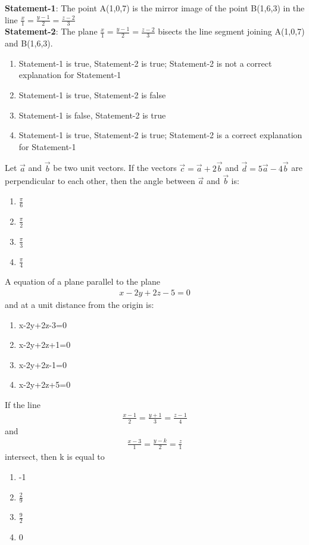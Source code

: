\item \textbf{Statement-1}: The point A(1,0,7) is the mirror image of the point B(1,6,3) in the line $\frac{x}{1}=\frac{y-1}{2}=\frac{z-2}{3}$\\
\textbf{Statement-2}: The plane $\frac{x}{1}=\frac{y-1}{2}=\frac{z-2}{3}$ bisects the line segment joining A(1,0,7) and B(1,6,3).
\begin{enumerate}
\item Statement-1 is true, Statement-2 is true; Statement-2 is not a correct explanation for Statement-1
\item Statement-1 is true, Statement-2 is false
\item Statement-1 is false, Statement-2 is true
\item Statement-1 is true, Statement-2 is true; Statement-2 is a correct explanation for Statement-1
\end{enumerate}

\item Let $\overrightarrow{a}$ and $\overrightarrow{b}$ be two unit vectors. If the vectors $\overrightarrow{c}=\overrightarrow{a}+2\overrightarrow{b}$ and $\overrightarrow{d}=5\overrightarrow{a}-4\overrightarrow{b}$ are perpendicular to each other, then the angle between $\overrightarrow{a}$ and $\overrightarrow{b}$ is:
\begin{enumerate}
\item $\frac{\pi}{6}$
\item $\frac{\pi}{2}$
\item $\frac{\pi}{3}$
\item $\frac{\pi}{4}$
\end{enumerate}

\item A equation of a plane parallel to the plane 
\begin{align}
x-2y+2z-5=0
\end{align}
and at a unit distance from the origin is:
\begin{enumerate}
\item x-2y+2z-3=0
\item x-2y+2z+1=0
\item x-2y+2z-1=0
\item x-2y+2z+5=0
\end{enumerate}

\item If the line 
\begin{align*}
\frac{x-1}{2}=\frac{y+1}{3}=\frac{z-1}{4}
\end{align*}
and 
\begin{align*}
\frac{x-3}{1}=\frac{y-k}{2}=\frac{z}{1}
\end{align*}
intersect, then k is equal to
\begin{enumerate}
\item -1
\item $\frac{2}{9}$
\item $\frac{9}{2}$
\item 0
\end{enumerate}

